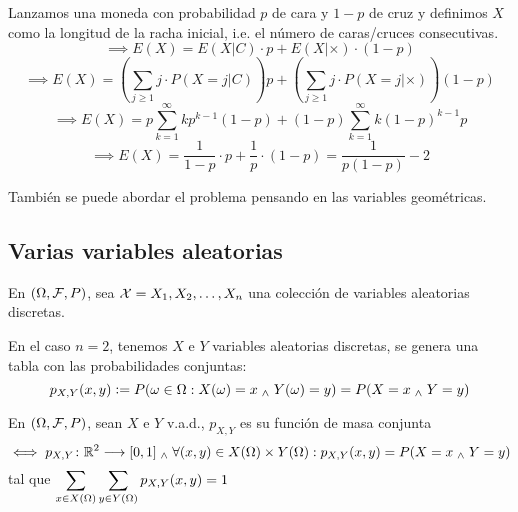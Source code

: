 \begin{ejem}
	Lanzamos una moneda con probabilidad $p$ de cara y $1-p$ de cruz y definimos $X$ como la longitud de la racha inicial, i.e. el número de caras/cruces consecutivas.
	\[\implies E(X)=E(X|C)\cdot p + E(X|\times)\cdot (1-p)\]
	\[\implies E(X)=\left(\sum_{j \geq 1} j \cdot P(X=j | C)\right)p + \left(\sum_{j \geq 1} j \cdot P(X=j | \times)\right)(1-p) \]
	\[\implies E(X)=p\sum_{k=1}^\infty k p^{k-1} (1-p) + (1-p)\sum_{k=1}^\infty k (1-p)^{k-1} p\]
	\[\implies E(X)=\frac{1}{1-p}\cdot p + \frac{1}{p} \cdot (1-p) = \frac{1}{p(1-p)}-2\]

	También se puede abordar el problema pensando en las variables geométricas.
\end{ejem}

\subsection{Varias variables aleatorias}

En $(\Omega, \mathcal{F}, P)$, sea $\mathcal{X}=X_1, X_2, \dots, X_n$ una colección de variables aleatorias discretas.

En el caso $n=2$, tenemos $X$ e $Y$ variables aleatorias discretas, se genera una tabla con las probabilidades conjuntas:
\[p_{X,Y}(x,y)\vcentcolon= P({\omega \in \Omega : X(\omega)=x \; _{\wedge} \; Y(\omega)=y})=P(X=x\; _{\wedge} \; Y=y)\]

\begin{defn}
	En $(\Omega, \mathcal{F}, P)$, sean $X$ e $Y$ v.a.d., $p_{X,Y}$ es su función de masa conjunta
	\[\iff p_{X,Y} \colon \mathbb{R}^2 \longrightarrow [0,1] \; _{\wedge} \; \forall (x,y) \in X(\Omega)\times Y(\Omega) : p_{X, Y}(x,y)=P(X=x\; _{\wedge} \; Y=y)\]
	tal que $\displaystyle\sum_{x\in X(\Omega)}\sum_{y\in Y(\Omega)}p_{X,Y}(x,y)=1$
\end{defn}


